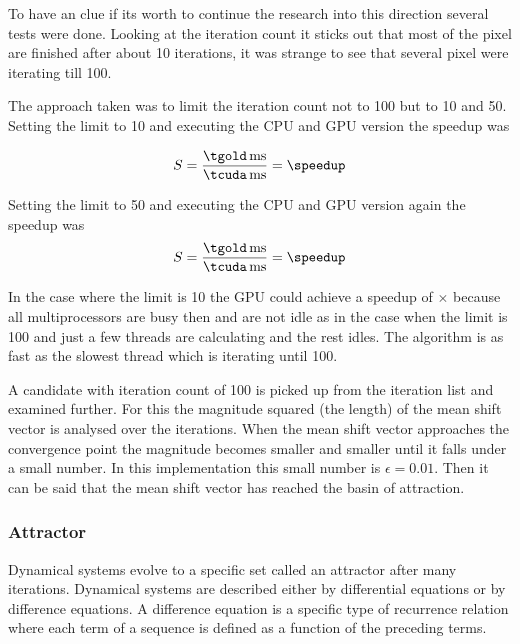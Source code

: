 To have an clue if its worth to continue the research into this direction several
tests were done. Looking at the iteration count it sticks out that most of the 
pixel are finished after about 10 iterations, it was strange to see that several
pixel were iterating till 100. 

The approach taken was to limit the iteration count not to 100 but to 10 and 50.
Setting the limit to 10 and executing the \gls{CPU} and \gls{GPU} version the
speedup was 
 
\fpDiv{\speedupten}{\tgold}{\tcuda}
\begin{equation*}\label{eq:speedup7}
		S = \frac{\unit[\tgold]{ms}}{\unit[\tcuda]{ms}} = \speedup
\end{equation*}

Setting the limit to 50 and executing the \gls{CPU} and \gls{GPU} version again
the speedup was
\fpDiv{\speedup}{\tgold}{\tcuda}
\begin{equation*}\label{eq:speedup8}
	S = \frac{\unit[\tgold]{ms}}{\unit[\tcuda]{ms}} = \speedup
\end{equation*}

In the case where the limit is 10 the \gls{GPU} could achieve a speedup of 
\fpDiv{\speedup}{\tgold}{\tcuda} \speedupten$\times$ because all multiprocessors
are busy then and are not idle as in the case when the limit is 100 and just a few
threads are calculating and the rest idles. The algorithm is as fast as the slowest
thread which is iterating until 100. 

A candidate with iteration count of 100 is picked up from the iteration list and
examined further. For this the magnitude squared (the length) of the mean shift
vector is analysed over the iterations. When the mean shift vector approaches
the convergence point the magnitude becomes smaller and smaller until it falls
under a small number. In this implementation this small number is
$\epsilon=0.01$. Then it can be said that the mean shift vector has reached the
basin of attraction.

\subsubsection{Attractor} %
\label{ssub:attractor}
Dynamical systems evolve to a specific set called an attractor after many
iterations. Dynamical systems are described either by differential equations or
by difference equations. A difference equation is a specific type of recurrence
relation where each term of a sequence is defined as a function of the
preceding terms.

